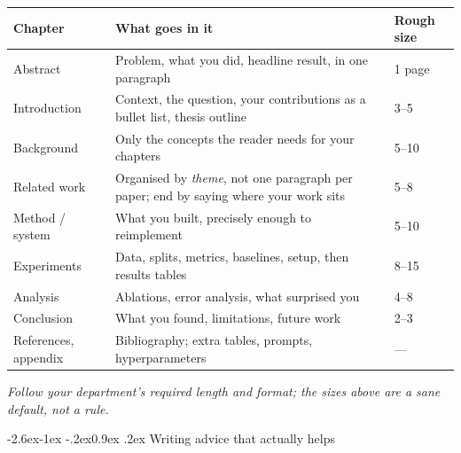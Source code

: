 \documentclass[11pt,a4paper]{article}
\makeatletter
\renewcommand\subsection{\@startsection{subsection}{2}{\z@}%
  {-2.6ex\@plus -1ex \@minus -.2ex}{0.9ex \@plus .2ex}%
  {\normalfont\large\bfseries\color{brandlight}}}
\newcommand{\thead}[1]{\textbf{\color{brand}#1}}
\makeatother
\begin{document}
\begin{center}
\small
\begin{tabularx}{\textwidth}{L{3.5cm} X L{2.0cm}}
\toprule
\thead{Chapter} & \thead{What goes in it} & \thead{Rough size} \\
\midrule
{}
Abstract & Problem, what you did, headline result, in one paragraph & 1 page \\
Introduction & Context, the question, your contributions as a bullet list,
thesis outline & 3--5 \\
Background & Only the concepts the reader needs for your chapters & 5--10 \\
Related work & Organised by \emph{theme}, not one paragraph per paper; end by
saying where your work sits & 5--8 \\
Method / system & What you built, precisely enough to reimplement & 5--10 \\
Experiments & Data, splits, metrics, baselines, setup, then results tables &
8--15 \\
Analysis & Ablations, error analysis, what surprised you & 4--8 \\
Conclusion & What you found, limitations, future work & 2--3 \\
References, appendix & Bibliography; extra tables, prompts, hyperparameters &
--- \\
\bottomrule
\end{tabularx}
\end{center}

\emph{Follow your department's required length and format; the sizes above are
a sane default, not a rule.}

\subsection{Writing advice that actually helps}
\end{document}
